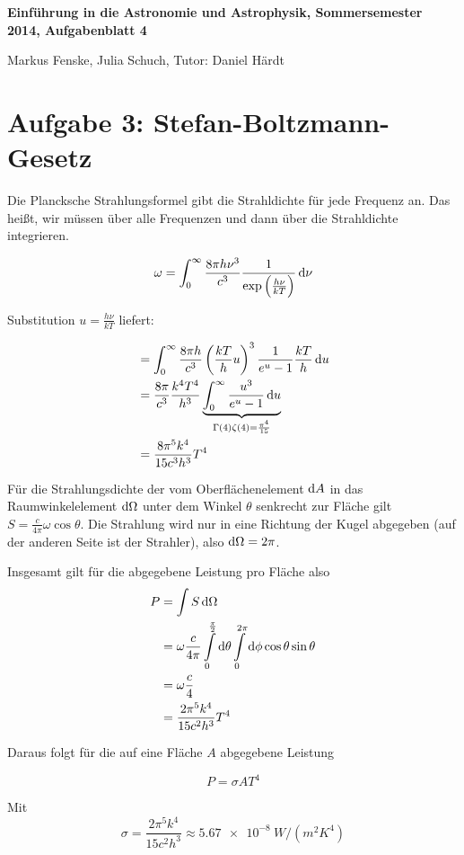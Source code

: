 \documentclass[a4paper,german,12pt,smallheadings]{scrartcl}
\begin{document}
\allowdisplaybreaks %
\begin{center}
\bfseries %
\sffamily %
\vspace{-40pt}
Einführung in die Astronomie und Astrophysik, Sommersemester 2014, Aufgabenblatt 4

Markus Fenske, Julia Schuch, Tutor: Daniel Härdt
\vspace{-10pt}
\end{center}
\section*{Aufgabe 3: Stefan-Boltzmann-Gesetz}

Die Plancksche Strahlungsformel gibt die Strahldichte für jede Frequenz an. Das
heißt, wir müssen über alle Frequenzen und dann über die Strahldichte integrieren.

\begin{align}
  \omega = \int_0^\infty \frac{8 \pi h \nu^3}{c^3} \frac{1}{\exp\del{\frac{h \nu}{k T}}} \dif \nu
\end{align}

Substitution $u = \frac{h \nu}{k T}$ liefert:

\begin{align}
  &= \int_0^\infty \frac{8 \pi h}{c^3} \del{ \frac{kT}{h} u}^3 \frac{1}{e^u - 1} \frac{kT}{h} \dif u \\
  &= \frac{8 \pi}{c^3} \frac{k^4 T^4}{h^3} \underbrace{\int_0^\infty \frac{u^3}{e^u - 1} \dif u}_{\mathclap{\Gamma(4) \zeta(4) = \frac{\pi^4}{15}}} \\
  &= \frac{8 \pi^5 k^4}{15 c^3 h^3} T^4
\end{align}

Für die Strahlungsdichte der vom Oberflächenelement $\dif A$ in das
Raumwinkelelement $\dif \Omega$ unter dem Winkel $\theta$ senkrecht zur Fläche
gilt $S = \frac{c}{4 \pi} \omega \cos \theta$. Die Strahlung wird nur in eine
Richtung der Kugel abgegeben (auf der anderen Seite ist der Strahler), also
$\dif \Omega = 2 \pi$.

Insgesamt gilt für die abgegebene Leistung pro Fläche also
\begin{align}
  P &= \int S \dif \Omega \\
    &= \omega \frac{c}{4 \pi} \int\limits_0^{\frac{\pi}{2}} \dif \theta \int\limits_0^{2 \pi} \dif \phi \cos \theta \sin \theta \\
    &= \omega \frac{c}{4} \\
    &= \frac{2 \pi^5 k^4}{15c^2h^3} T^4
\end{align}

Daraus folgt für die auf eine Fläche $A$ abgegebene Leistung

\begin{equation}
  P = \sigma A T^4
\end{equation}

Mit
\begin{equation}
  \sigma = \frac{2 \pi^5 k^4}{15 c^2 h^3} \approx \SI{5.67e-8}{W/(m^2 K^4)}
\end{equation}
\end{document}

